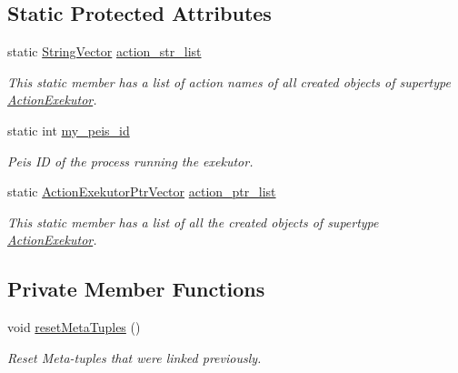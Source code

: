 \subsection*{\-Static \-Protected \-Attributes}
\begin{DoxyCompactItemize}
\item 
static \hyperlink{namespaceexekutor_a58d8a9cd227883a8eacb6400c9f62acb}{\-String\-Vector} \hyperlink{classexekutor_1_1ActionExekutor_a0dc39a7a2a3a67d2bdd366f9e6e682a2}{action\-\_\-str\-\_\-list}
\begin{DoxyCompactList}\small\item\em \-This static member has a list of action names of all created objects of supertype \hyperlink{classexekutor_1_1ActionExekutor}{\-Action\-Exekutor}. \end{DoxyCompactList}\item 
static int \hyperlink{classexekutor_1_1ActionExekutor_a31644a88e4d0166c2d3a70bab9eb5b99}{my\-\_\-peis\-\_\-id}
\begin{DoxyCompactList}\small\item\em \-Peis \-I\-D of the process running the exekutor. \end{DoxyCompactList}\item 
static \hyperlink{namespaceexekutor_a141a8f9a739e67ffb2356da18a653162}{\-Action\-Exekutor\-Ptr\-Vector} \hyperlink{classexekutor_1_1ActionExekutor_a73c4f2607b0725f5b201cf501cb42578}{action\-\_\-ptr\-\_\-list}
\begin{DoxyCompactList}\small\item\em \-This static member has a list of all the created objects of supertype \hyperlink{classexekutor_1_1ActionExekutor}{\-Action\-Exekutor}. \end{DoxyCompactList}\end{DoxyCompactItemize}
\subsection*{\-Private \-Member \-Functions}
\begin{DoxyCompactItemize}
\item 
void \hyperlink{classexekutor_1_1ActionExekutor_a73b5509aeadf1d592b3b2b27bd9ce2ae}{reset\-Meta\-Tuples} ()
\begin{DoxyCompactList}\small\item\em \-Reset \-Meta-\/tuples that were linked previously. \end{DoxyCompactList}\end{DoxyCompactItemize}


